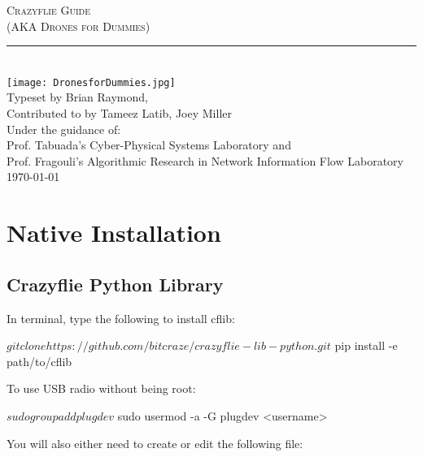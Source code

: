 \documentclass[]{article}
\def\changemargin#1#2{\list{}{\rightmargin#2\leftmargin#1}\item[]}
\newcommand{\docname}{Crazyflie Guide}
\newcommand{\informalname}{Drones for Dummies}
\newcommand{\typesetter}{Brian Raymond}
\newcommand{\contributors}{Tameez Latib, Joey Miller}
\newcommand{\labnames}{Prof. Tabuada's Cyber-Physical Systems Laboratory and \\Prof. Fragouli's Algorithmic Research in Network Information Flow Laboratory}
\begin{document}
	
\begin{titlepage}
	\begin{center}
		{\LARGE \textsc{\docname \\ (AKA \informalname)} \\ \vspace{4pt}}
		\rule[13pt]{\textwidth}{1pt} \\
		\texttt{[image: DronesforDummies.jpg]} \\
		{\vspace{1em} \large Typeset by \typesetter,\\ Contributed to by \contributors \\ \vspace{10pt}
			Under the guidance of:\\ \labnames \\ \vspace{10pt}
			\today \\ \vspace{10pt}
		}
	\end{center}
\end{titlepage}



\cleardoublepage
\setcounter{page}{1}

\tableofcontents
\newpage

\changemargin{-1in}{-1in}

\section{Native Installation}
\subsection{Crazyflie Python Library}
\noindent In terminal, type the following to install cflib:
	
\begin{terminal}
$ git clone https://github.com/bitcraze/crazyflie-lib-python.git
$ pip install -e path/to/cflib
\end{terminal}

\noindent To use USB radio without being root:
	
\begin{terminal}
$ sudo groupadd plugdev
$ sudo usermod -a -G plugdev <username>
\end{terminal}

\noindent You will also either need to create or edit the following file:
	
\end{document}
